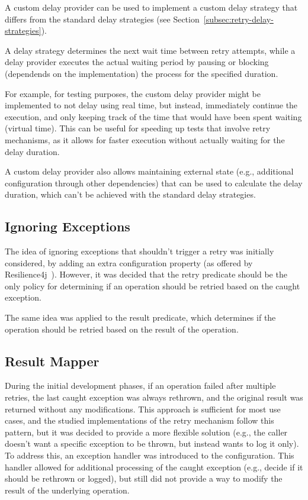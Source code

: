 A custom delay provider can be used
to implement a custom delay strategy that differs from the standard delay strategies
(see Section~\ref{subsec:retry-delay-strategies}).

A delay strategy determines the next wait time between retry attempts,
while a delay provider executes the actual waiting period by pausing or blocking
(dependends on the implementation) the process for the specified duration.

For example, for testing purposes, the custom delay provider might be implemented to not delay using real time,
but instead, immediately continue the execution,
and only keeping track of the time that would have been spent waiting (virtual time).
This can be useful for speeding up tests that involve retry mechanisms,
as it allows for faster execution without actually waiting for the delay duration.

A custom delay provider also allows maintaining external state
(e.g., additional configuration through other dependencies) that can be used to calculate the delay duration,
which can't be achieved with the standard delay strategies.

\subsection{Ignoring Exceptions}\label{subsec:retry-ignoring-exceptions}

The idea of ignoring exceptions that shouldn't trigger a retry was initially considered,
by adding an extra configuration property (as offered by Resilience4j~\cite{resilience4j-retry}).
However, it was decided
that the retry predicate should be the only policy
for determining if an operation should be retried based on the caught exception.

The same idea was applied to the result predicate,
which determines if the operation should be retried based on the result of the operation.

\subsection{Result Mapper}\label{subsec:retry-result-mapper}

During the initial development phases, if an operation failed after multiple retries,
the last caught exception was always rethrown,
and the original result was returned without any modifications.
This approach is sufficient for most use cases,
and the studied implementations of the retry mechanism follow this pattern, but
it was decided to provide a more flexible solution
(e.g., the caller doesn't want a specific exception to be thrown, but instead wants to log it only).
To address this, an exception handler was introduced to the configuration.
This handler allowed for additional processing of the caught exception
(e.g., decide if it should be rethrown or logged),
but still did not provide a way to modify the result of the underlying operation.

